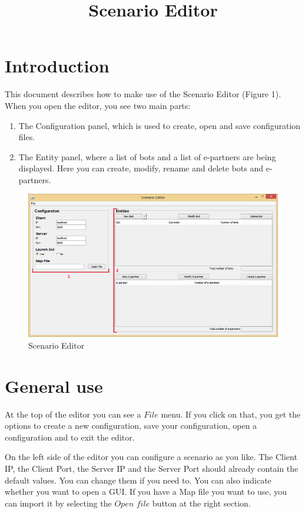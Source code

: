 \documentclass[a4paper]{article}
\title{Scenario Editor}
\date{}
\begin{document}
\maketitle
\newpage

\tableofcontents
\newpage

\section{Introduction}
This document describes how to make use of the Scenario Editor (Figure 1). When you open the editor, you see two main parts:
\begin{enumerate}
\item The Configuration panel, which is used to create, open and save configuration files.
\item The Entity panel, where a list of bots and a list of e-partners are being displayed. Here you can create, modify, rename and delete bots and e-partners.
\end{enumerate}

\begin{figure}[h]
\includegraphics{editor.png}
\caption{Scenario Editor}
\end{figure}

\section{General use}
At the top of the editor you can see a $File$ menu. If you click on that, you get the options to create a new configuration, save your configuration, open a configuration and to exit the editor.

On the left side of the editor you can configure a scenario as you like. The Client IP, the Client Port, the Server IP and the Server Port should already contain the default values. You can change them if you need to. You can also indicate whether you want to open a GUI. If you have a Map file you want to use, you can import it by selecting the $Open$ $file$ button at the right section.
\end{document}

